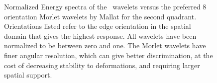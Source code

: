   \begin{figure}
    \newline
    \subfloat{%
      \makebox[\textwidth][c]{%
    }}
    \newline
    \caption[Comparison of the energy spectra for \DTCWT\ wavelets to Morlet
    wavelets]
    {Normalized Energy spectra of the \DTCWT\ wavelets versus the preferred
            8 orientation Morlet wavelets by Mallat for the second quadrant.
            Orientations listed refer to the edge orientation in the spatial
            domain that gives the highest response. All wavelets have been
            normalized to be between zero and one.
            The Morlet wavelets have finer angular
            resolution, which can give better discrimination, at the cost of
            decreasing stability to deformations, and requiring larger spatial
            support.}
    \label{fig:wavelet_freq_resp}
  \end{figure}

      
